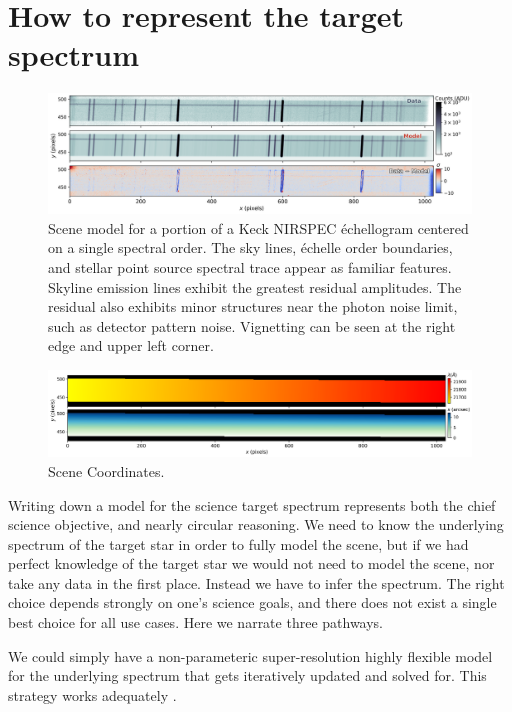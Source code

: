 \documentclass[twocolumn]{aastex631}
\begin{document}
\section{How to represent the target spectrum}

\begin{figure}[t!]
  \centering
  \includegraphics[width=0.98\linewidth]{figures/scene_model_single_order.png}
  \caption{Scene model for a portion of a Keck NIRSPEC \'echellogram centered on a single spectral order.  The sky lines, \'echelle order boundaries, and stellar point source spectral trace appear as familiar features.  Skyline emission lines exhibit the greatest residual amplitudes.  The residual also exhibits minor structures near the photon noise limit, such as detector pattern noise.  Vignetting can be seen at the right edge and upper left corner.}
  \label{fig:sceneModelSingleOrder}
\end{figure}


\begin{figure}[t!]
  \centering
  \includegraphics[width=0.98\linewidth]{figures/scene_coordinates.png}
  \caption{Scene Coordinates. \lipsum[2]}
  \label{fig:sceneCoordinates}
\end{figure}


Writing down a model for the science target spectrum represents both the chief science objective, and nearly circular reasoning. We need to know the underlying spectrum of the target star in order to fully model the scene, but if we had perfect knowledge of the target star we would not need to model the scene, nor take any data in the first place.  Instead we have to infer the spectrum.  The right choice depends strongly on one's science goals, and there does not exist a single best choice for all use cases.  Here we narrate three pathways.

We could simply have a non-parameteric super-resolution highly flexible model for the underlying spectrum that gets iteratively updated and solved for.  This strategy works adequately \citep{2010PASP..122..248B}.
\end{document}
